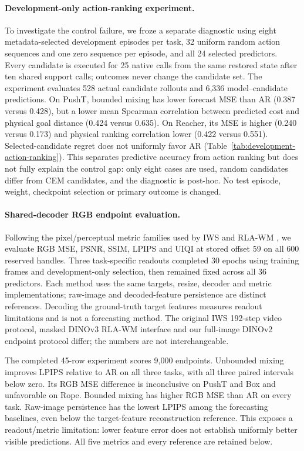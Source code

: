 \paragraph{Development-only action-ranking experiment.}
To investigate the control failure, we froze a separate diagnostic using eight
metadata-selected development episodes per task, 32 uniform random action
sequences and one zero sequence per episode, and all 24 selected predictors.
Every candidate is executed for 25 native calls from the same restored state
after ten shared support calls; outcomes never change the candidate set.
The experiment evaluates 528 actual candidate rollouts and 6,336 model--candidate
predictions. On PushT, bounded mixing has lower forecast MSE than AR
(0.387 versus 0.428), but a lower mean Spearman correlation between predicted
cost and physical goal distance (0.424 versus 0.635). On Reacher, its MSE is
higher (0.240 versus 0.173) and physical ranking correlation lower
(0.422 versus 0.551). Selected-candidate regret does not uniformly favor AR
(Table~\ref{tab:development-action-ranking}). This separates predictive accuracy
from action ranking but does not fully explain the control gap: only eight
cases are used, random candidates differ from CEM candidates, and the diagnostic
is post-hoc. No test episode, weight, checkpoint selection or primary outcome
is changed.



\paragraph{Shared-decoder RGB endpoint evaluation.}
Following the pixel/perceptual metric families used by IWS and RLA-WM
\citep{wang2026iws,zhang2026rlawm}, we evaluate RGB MSE, PSNR, SSIM, LPIPS and
UIQI at stored offset 59 on all 600 reserved handles. Three task-specific readouts
completed 30 epochs using training frames and development-only selection, then
remained fixed across all 36 predictors. Each method uses the same targets,
resize, decoder and metric implementations; raw-image and decoded-feature
persistence are distinct references. Decoding the ground-truth target features
measures readout limitations and is not a forecasting method.
The original IWS 192-step video protocol, masked DINOv3 RLA-WM interface and our
full-image DINOv2 endpoint protocol differ; the numbers are not interchangeable.

The completed 45-row experiment scores 9,000 endpoints. Unbounded mixing improves
LPIPS relative to AR on all three tasks, with all three paired intervals below
zero. Its RGB MSE difference is inconclusive on PushT and Box and unfavorable
on Rope. Bounded mixing has higher RGB MSE than AR on every task. Raw-image
persistence has the lowest LPIPS among the forecasting baselines, even below
the target-feature reconstruction reference. This exposes a readout/metric
limitation: lower feature error does not establish uniformly better visible
predictions. All five metrics and every reference are retained below.

